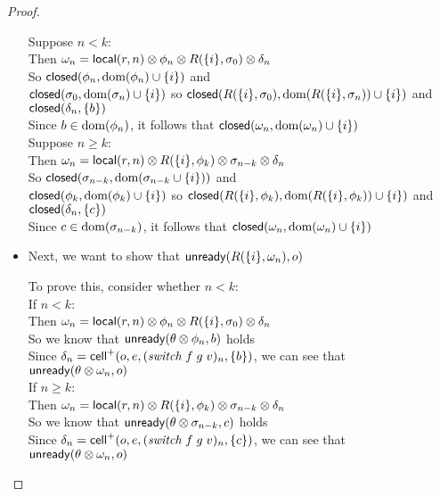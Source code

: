 \begin{proof}
\begin{itemize}
  \begin{tabbedproof}
    \oo Suppose $n < k$:\\
    \ooo Then $\omega_n = \mathsf{local}({r}, {n}) \otimes \phi_n \otimes R(\{{i}\}, \sigma_0) \otimes \delta_n$ \\
    \ooo So $\mathsf{closed}({\phi_n}, {\mbox{dom}({\phi_n}) \cup \{{i}\}})$ and \\
    \ooox $\mathsf{closed}({\sigma_0}, {\mbox{dom}({\sigma_n}) \cup \{{i}\}})$ so $\mathsf{closed}({R(\{{i}\}, \sigma_0)}, {\mbox{dom}({R(\{{i}\}, \sigma_n)}) \cup \{{i}\}})$ and \\
    \ooox $\mathsf{closed}({\delta_n}, {\{{b}\}})$ \\
    \ooo Since $b \in \mbox{dom}({\phi_n})$, it follows that $\mathsf{closed}({\omega_n}, {\mbox{dom}({\omega_n}) \cup \{{i}\}})$ \\
    \oo Suppose $n \geq k$:\\
    \ooo Then $\omega_n = \mathsf{local}({r}, {n}) \otimes R(\{{i}\}, \phi_k) \otimes \sigma_{n-k} \otimes \delta_n$ \\
    \ooo So $\mathsf{closed}({\sigma_{n-k}}, {\mbox{dom}({\sigma_{n-k} \cup \{{i}\}})})$ and \\
    \ooox $\mathsf{closed}({\phi_k}, {\mbox{dom}({\phi_k}) \cup \{{i}\}})$ so $\mathsf{closed}({R(\{{i}\}, \phi_k)}, {\mbox{dom}({R(\{{i}\}, \phi_k)}) \cup \{{i}\}})$ and \\
    \ooox $\mathsf{closed}({\delta_n}, {\{{c}\}})$ \\
    \ooo Since $c \in \mbox{dom}({\sigma_{n-k}})$, it follows that $\mathsf{closed}({\omega_n}, {\mbox{dom}({\omega_n}) \cup \{{i}\}})$  \end{tabbedproof}

\item Next, we want to show that $\mathsf{unready}({R(\{{i}\}, \omega_n)}, {o})$

  \begin{tabbedproof}
    \oo To prove this, consider whether $n < k$:\\
    \oo If $n < k$:\\
    \ooo Then $\omega_n = \mathsf{local}({r}, {n}) \otimes \phi_n \otimes R(\{{i}\}, \sigma_0) \otimes \delta_n$ \\
    \ooo So we know that $\mathsf{unready}({\theta \otimes \phi_n}, {b})$ holds \\
    \ooo Since $\delta_n = \mathsf{cell}^{+}({o}, {e}, {(\mathit{switch}\;f\;g\;v)_n}, {\{{b}\}})$, we can see that \\
    \ooo $\mathsf{unready}({\theta \otimes \omega_n}, {o})$ \\
    \oo If $n \geq k$: \\
    \ooo Then $\omega_n = \mathsf{local}({r}, {n}) \otimes R(\{{i}\}, \phi_k) \otimes \sigma_{n-k} \otimes \delta_n$ \\
    \ooo So we know that $\mathsf{unready}({\theta \otimes \sigma_{n-k}}, {c})$ holds \\
    \ooo Since $\delta_n = \mathsf{cell}^{+}({o}, {e}, {(\mathit{switch}\;f\;g\;v)_n}, {\{{c}\}})$, we can see that \\
    \ooo $\mathsf{unready}({\theta \otimes \omega_n}, {o})$ \\
  \end{tabbedproof}



\end{itemize}
\end{proof}
